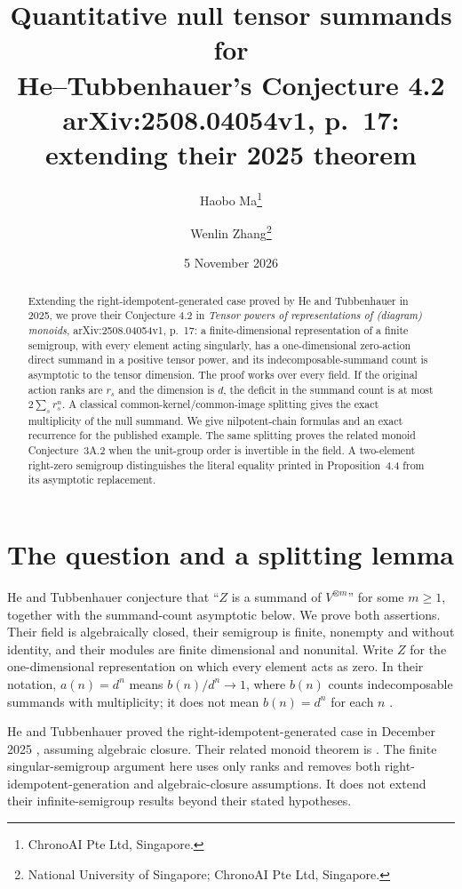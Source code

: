 \documentclass[11pt]{article}
\title{Quantitative null tensor summands for\protect\\He--Tubbenhauer's Conjecture 4.2\protect\\
\large arXiv:2508.04054v1, p.~17:\protect\\extending their 2025 theorem}
\author{Haobo Ma\thanks{ChronoAI Pte Ltd, Singapore.}\and
Wenlin Zhang\thanks{National University of Singapore; ChronoAI Pte Ltd, Singapore.}}
\date{5 November 2026}
\begin{document}
\maketitle
\begin{abstract}
Extending the right-idempotent-generated case proved by He and Tubbenhauer
in 2025, we prove their Conjecture 4.2 in \emph{Tensor powers of
representations of (diagram) monoids}, arXiv:\allowbreak2508.04054v1, p.~17:
a finite-dimensional representation of a finite semigroup, with every element
acting singularly, has a one-dimensional zero-action direct summand in a positive
tensor power, and its indecomposable-summand count is asymptotic to the tensor
dimension. The proof works over every field. If the original action ranks are
\(r_s\) and the dimension is \(d\), the deficit in the summand count is at most
\(2\sum_s r_s^n\). A classical common-kernel/common-image splitting gives the exact
multiplicity of the null summand. We give nilpotent-chain formulas and an exact
recurrence for the published example. The same splitting proves the related monoid
Conjecture~3A.2 when the unit-group order is invertible in the field. A two-element
right-zero semigroup distinguishes the literal equality printed in
Proposition~4.4 from its asymptotic replacement.
\end{abstract}

\section{The question and a splitting lemma}
He and Tubbenhauer \cite[Conjecture 4.2, p.~17]{HT25} conjecture that
``\(Z\) is a summand of \(V^{\otimes m}\)'' for some \(m\geq1\), together
with the summand-count asymptotic below. We prove both assertions.
Their field is algebraically closed, their semigroup is finite, nonempty and
without identity, and their modules are finite dimensional and nonunital.
Write \(Z\) for the one-dimensional representation on which every element acts
as zero. In their notation, \(a(n)=d^n\) means \(b(n)/d^n\to1\), where
\(b(n)\) counts indecomposable summands with multiplicity; it does not mean
\(b(n)=d^n\) for each \(n\) \cite[\S1, p.~1]{HT25}.

He and Tubbenhauer proved the right-idempotent-generated case in December 2025
\cite[v2, Theorem 4A.14(e)--(f), p.~20; v3, p.~22]{HT26}, assuming algebraic
closure. Their related monoid theorem is \cite[Theorem 4A.12(c)--(d)]{HT26}.
The finite singular-semigroup argument here uses only ranks and removes both
right-idempotent-generation and algebraic-closure assumptions. It does not
extend their infinite-semigroup results beyond their stated hypotheses.
\end{document}
